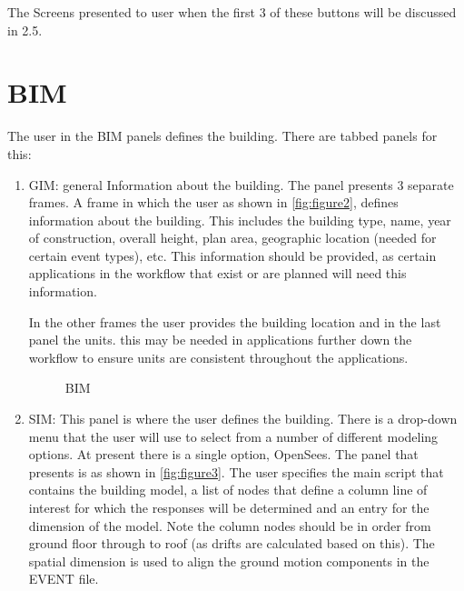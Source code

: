 The Screens presented to user when the first 3 of these buttons will be discussed in 2.5.

\section{BIM}
The user in the BIM panels defines the building. There are tabbed panels for this:
\begin{enumerate}
\item	GIM: general Information about the building. The panel presents 3 separate frames. A frame in which the user as shown in \autoref{fig:figure2}, 
defines information about the building. This includes the building type, name, year of construction, overall height, plan area, geographic location (needed for certain event types), etc. 
This information should be provided, as certain applications in the workflow that exist or are planned will need this information. 


In the other frames the user provides the building location and in the
last panel the units. this may be needed in applications further down
the workflow to ensure units are consistent throughout the
applications.

\begin{figure}[!htbp]
  \caption{BIM}
  \label{fig:figure2}
\end{figure}


\item SIM: This panel is where the user defines the building. 
There is a drop-down menu that the user will use to select from a number of different modeling options. 
At present there is a single option, OpenSees. 
The panel that presents is as shown in \autoref{fig:figure3}. 
The user specifies the main script that contains the building model, 
a list of nodes that define a column line of interest for which the responses will be determined and an entry for the dimension of the model. 
Note the column nodes should be in order from ground floor through to roof (as drifts are calculated based on this). 
The spatial dimension is used to align the ground motion components in the EVENT file.


\end{enumerate}
